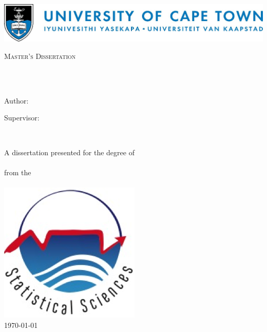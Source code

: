 \documentclass[
12pt, %
english, %
singlespacing, %
parskip, %
headsepline, %
]{MastersDoctoralThesis} %
\author{Pavan \textsc{Singh}} %
\numberwithin{theorem}{section}
\numberwithin{remark}{section}
\numberwithin{assumption}{section}
\begin{document}
\frontmatter %
\pagestyle{plain} %


\begin{titlepage}
\begin{center}

\includegraphics*[width=\linewidth]{Figures/UCTLogoLong.jpg} 

\vspace*{.06\textheight}
{\scshape\LARGE \univname\par}\vspace{1.0cm} %
\textsc{\Large Master's Dissertation}\\[0.5cm] %

\HRule \\[0.4cm] %
{\large \bfseries \ttitle\par}\vspace{0.4cm} %
\HRule \\[1.5cm] %
 
\begin{minipage}[t]{0.4\textwidth}
\begin{flushleft} \large
{Author:}\\
\authorname
\end{flushleft}
\end{minipage}
\begin{minipage}[t]{0.4\textwidth}
\begin{flushright} \large
{Supervisor:} \\
\supname
\end{flushright}
\end{minipage}\\[1cm]

\vfill

\large {A dissertation presented for the degree of \\ \degreename \ }\\[0.3cm] %
{from the}\\[0.4cm]
\deptname\\[1cm] %
\includegraphics*[width=0.25\linewidth]{Figures/statslogo.png} \\[1cm]
{\large \today}\\[4cm] %
 

\end{center}
\end{titlepage}
\end{document}
